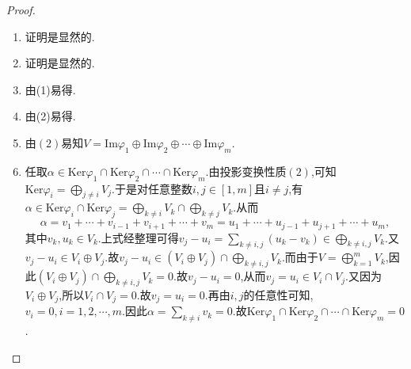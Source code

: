 \documentclass[../../main.tex]{subfiles}%
\begin{document}
\begin{proof}
\begin{enumerate}[(1)]
\item 证明是显然的.

\item 证明是显然的.

\item 由(1)易得.

\item 由(2)易得.

\item 由\((2)\)易知\(V = \text{Im}\varphi_1\oplus\text{Im}\varphi_2\oplus\cdots\oplus\text{Im}\varphi_m\).

\item 任取\(\alpha \in \mathrm{Ker}\varphi_1\cap \mathrm{Ker}\varphi_2\cap \cdots \cap \mathrm{Ker}\varphi_m\).由投影变换性质\((2)\),可知\(\mathrm{Ker}\varphi_i = \bigoplus_{j\neq i}V_j\).于是对任意整数\(i, j\in [1, m]\)且\(i\neq j\),有\(\alpha \in \mathrm{Ker}\varphi_i\cap \mathrm{Ker}\varphi_j = \bigoplus_{k\neq i}V_k\cap \bigoplus_{k\neq j}V_k\).从而
\[
\alpha = v_1 + \cdots + v_{i - 1} + v_{i + 1} + \cdots + v_m = u_1 + \cdots + u_{j - 1} + u_{j + 1} + \cdots + u_m,
\]
其中\(v_k, u_k\in V_k\).上式经整理可得\(v_j - u_i = \sum_{k\neq i, j}(u_k - v_k)\in \bigoplus_{k\neq i, j}V_k\).又\(v_j - u_i\in V_i\oplus V_j\).故\(v_j - u_i\in (V_i\oplus V_j)\cap \bigoplus_{k\neq i, j}V_k\).而由于\(V = \bigoplus_{k = 1}^m V_k\),因此\((V_i\oplus V_j)\cap \bigoplus_{k\neq i, j}V_k = 0\).故\(v_j - u_i = 0\),从而\(v_j = u_i\in V_i\cap V_j\).又因为\(V_i\oplus V_j\),所以\(V_i\cap V_j = 0\).故\(v_j = u_i = 0\).再由\(i, j\)的任意性可知,\(v_i = 0, i = 1, 2, \cdots, m\).因此\(\alpha = \sum_{k\neq i}v_k = 0\).故\(\mathrm{Ker}\varphi_1\cap \mathrm{Ker}\varphi_2\cap \cdots \cap \mathrm{Ker}\varphi_m = 0\).
\end{enumerate}
\end{proof}
\end{document}
